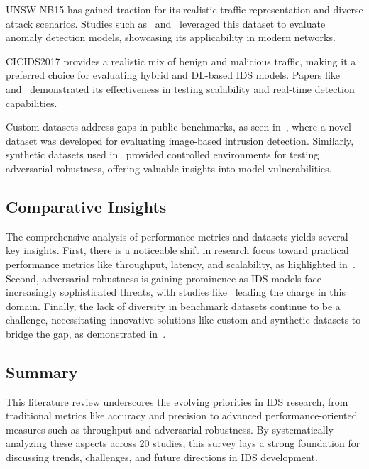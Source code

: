 UNSW-NB15 has gained traction for its realistic traffic representation and diverse attack scenarios. Studies such as~\cite{Gutierrez2023} and~\cite{Sowmya2023} leveraged this dataset to evaluate anomaly detection models, showcasing its applicability in modern networks.

CICIDS2017 provides a realistic mix of benign and malicious traffic, making it a preferred choice for evaluating hybrid and DL-based IDS models. Papers like~\cite{vinayakumar2019deep} and~\cite{Islam2023} demonstrated its effectiveness in testing scalability and real-time detection capabilities.

Custom datasets address gaps in public benchmarks, as seen in~\cite{Ghadermazi2024}, where a novel dataset was developed for evaluating image-based intrusion detection. Similarly, synthetic datasets used in~\cite{Alotaibi2023AML} provided controlled environments for testing adversarial robustness, offering valuable insights into model vulnerabilities.




\subsection{Comparative Insights}
The comprehensive analysis of performance metrics and datasets yields several key insights. First, there is a noticeable shift in research focus toward practical performance metrics like throughput, latency, and scalability, as highlighted in~\cite{Gutierrez2023}. Second, adversarial robustness is gaining prominence as IDS models face increasingly sophisticated threats, with studies like~\cite{Alotaibi2023AML} leading the charge in this domain. Finally, the lack of diversity in benchmark datasets continue to be a challenge, necessitating innovative solutions like custom and synthetic datasets to bridge the gap, as demonstrated in~\cite{Ghadermazi2024}.




\subsection{Summary}
This literature review underscores the evolving priorities in IDS research, from traditional metrics like accuracy and precision to advanced performance-oriented measures such as throughput and adversarial robustness. By systematically analyzing these aspects across 20 studies, this survey lays a strong foundation for discussing trends, challenges, and future directions in IDS development.



